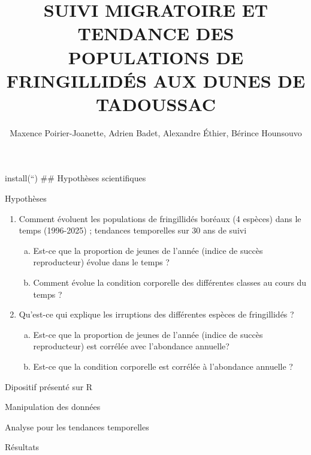 \documentclass[
  ignorenonframetext,
]{beamer}
\title{SUIVI MIGRATOIRE ET TENDANCE DES POPULATIONS DE FRINGILLIDÉS AUX
DUNES DE TADOUSSAC}
\author{Maxence Poirier-Joanette, Adrien Badet, Alexandre Éthier,
Bérince Hounsouvo}
\date{}
\providecommand{\tightlist}{%
  \setlength{\itemsep}{0pt}\setlength{\parskip}{0pt}}\usepackage{longtable,booktabs,array}
\begin{document}
\frame{\titlepage}


\begin{frame}
install(``) \#\# Hypothèses scientifiques
\end{frame}

\begin{frame}{Hypothèses}
\label{hypothuxe8ses}
\begin{enumerate}
[1)]
\tightlist
\item
  Comment évoluent les populations de fringillidés boréaux (4 espèces)
  dans le temps (1996-2025) ; tendances temporelles sur 30 ans de suivi

  \begin{enumerate}
  [a)]
  \tightlist
  \item
    Est-ce que la proportion de jeunes de l'année (indice de succès
    reproducteur) évolue dans le temps ?
  \item
    Comment évolue la condition corporelle des différentes classes au
    cours du temps ?
  \end{enumerate}
\item
  Qu'est-ce qui explique les irruptions des différentes espèces de
  fringillidés ?

  \begin{enumerate}
  [a)]
  \tightlist
  \item
    Est-ce que la proportion de jeunes de l'année (indice de succès
    reproducteur) est corrélée avec l'abondance annuelle?
  \item
    Est-ce que la condition corporelle est corrélée à l'abondance
    annuelle ?
  \end{enumerate}
\end{enumerate}
\end{frame}

\begin{frame}{Dipositif présenté sur R}
\label{dipositif-pruxe9sentuxe9-sur-r}
\end{frame}

\begin{frame}{Manipulation des données}
\label{manipulation-des-donnuxe9es}
\end{frame}

\begin{frame}{Analyse pour les tendances temporelles}
\label{analyse-pour-les-tendances-temporelles}
\end{frame}

\begin{frame}{Résultats}
\label{ruxe9sultats}
\end{frame}
\end{document}
